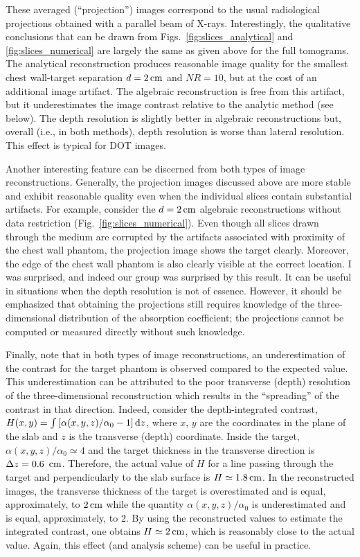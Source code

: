 These averaged (``projection'') images correspond to the usual radiological projections obtained with a parallel beam of X-rays. Interestingly, the qualitative conclusions that can be drawn from Figs.~\ref{fig:slices_analytical} and \ref{fig:slices_numerical} are largely the same as given above for the full tomograms. The analytical reconstruction produces reasonable image quality for the smallest chest wall-target separation $d=2\,{\rm cm}$ and $NR=10$, but at the cost of an additional image artifact. The algebraic reconstruction is free from this artifact, but it underestimates the image contrast relative to the analytic method (see below). The depth resolution is slightly better in algebraic reconstructions but, overall (i.e., in both methods), depth resolution is worse than lateral resolution. This effect is typical for DOT images.

Another interesting feature can be discerned from both types of image reconstructions. Generally, the projection images discussed above are more stable and exhibit reasonable quality even when the individual slices contain substantial artifacts. For example, consider the $d=2\,{\rm cm}$ algebraic reconstructions without data restriction (Fig.~\ref{fig:slices_numerical}). Even though all slices drawn through the medium are corrupted by the artifacts associated with proximity of the chest wall phantom, the projection image shows the target clearly. Moreover, the edge of the chest wall phantom is also clearly visible at the correct location. I was surprised, and indeed our group was surprised by this result. It can be useful in situations when the depth resolution is not of essence. However, it should be emphasized that obtaining the projections still requires knowledge of the three-dimensional distribution of the absorption coefficient; the projections cannot be computed or measured directly without such knowledge.

Finally, note that in both types of image reconstructions, an underestimation of the contrast for the target phantom is observed compared to the expected value. This underestimation can be attributed to the poor transverse (depth) resolution of the three-dimensional reconstruction which results in the ``spreading'' of the contrast in that direction. Indeed, consider the depth-integrated contrast, $H(x,y) = \int \left[\alpha(x,y,z) / \alpha_0 - 1 \right] {\rm d}z$, where $x$, $y$ are the coordinates in the plane of the slab and $z$ is the transverse (depth) coordinate. Inside the target, $\alpha(x,y,z) / \alpha_0 \simeq 4$ and the target thickness in the transverse direction is $\Delta z=0.6\,\ {\rm cm}$. Therefore, the actual value of $H$ for a line passing through the target and perpendicularly to the slab surface is $H\simeq 1.8\,{\rm cm}$. In the reconstructed images, the transverse thickness of the target is overestimated and is equal, approximately, to $2\,{\rm cm}$ while the quantity $\alpha(x,y,z)/\alpha_0$ is underestimated and is equal, approximately, to 2. By using the reconstructed values to estimate the integrated contrast, one obtains $H\simeq 2\,{\rm cm}$, which is reasonably close to the actual value. Again, this effect (and analysis scheme) can be useful in practice.

